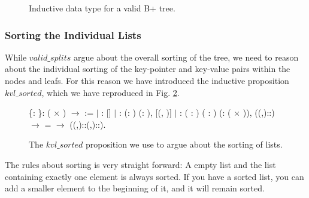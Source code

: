 \begin{figure}
\centering

\caption{Inductive data type for a valid B+ tree.}
\label{fig:inductive_valid_bplustree}
\end{figure}

\subsubsection{Sorting the Individual Lists}
\label{sec:Kvl_sorted}
While $valid\_splits$ argue about the overall sorting of the tree, we need to reason about the individual sorting of the key-pointer and key-value pairs within the nodes and leafs. For this reason we have introduced the inductive proposition $kvl\_sorted$, which we have reproduced in Fig. \ref{fig:kvl_sorted}.

\begin{figure}
  \begin{coqdoccode}
  \coqdocnoindent
    \{: \}:  ( \ensuremath{\times} ) \ensuremath{\rightarrow}  :=\coqdoceol
  \coqdocindent{1.00em}
  \ensuremath{|}
  :  []\coqdoceol
  \coqdocindent{1.00em}
  \ensuremath{|} : \coqdockw{\ensuremath{\forall}} (: ) (: ), \coqdoceol
  \coqdocindent{8.00em}
   [(, )]\coqdoceol
  \coqdocindent{1.00em}
  \ensuremath{|} : \coqdockw{\ensuremath{\forall}} ( : ) ( : ) (:  ( \ensuremath{\times} )), \coqdoceol
  \coqdocindent{8.00em}
   ((,)::) \ensuremath{\rightarrow} \coqdoceol
  \coqdocindent{8.00em}
     =  \ensuremath{\rightarrow}\coqdoceol
  \coqdocindent{8.00em}
   ((,)::(,)::).\coqdoceol
  \end{coqdoccode}
  \caption{The $kvl\_sorted$ proposition we use to argue about the sorting of lists.}
  \label{fig:kvl_sorted}
\end{figure}

The rules about sorting is very straight forward: A empty list and the list containing exactly one element is always sorted. If you have a sorted list, you can add a smaller element to the beginning of it, and it will remain sorted.

